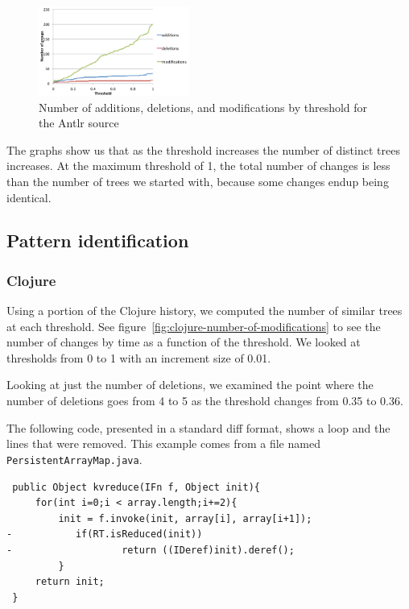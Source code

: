 \begin{figure}
\begin{center}
\includegraphics[width=0.44\textwidth]{figures/antlr-number-of-modifications.pdf}
\caption{Number of additions, deletions, and modifications by threshold for the Antlr source}
\label{fig:antlr-number-of-modifications}
\end{center}
\end{figure}

The graphs show us that as the threshold increases the number of distinct trees
increases. At the maximum threshold of 1, the total number of changes is less
than the number of trees we started with, because some changes endup being
identical.

\subsection{Pattern identification}

\subsubsection{Clojure}
Using a portion of the Clojure history, we computed the number of similar trees
at each threshold. See figure~\ref{fig:clojure-number-of-modifications} to see
the number of changes by time as a function of the threshold. We looked at
thresholds from 0 to 1 with an increment size of 0.01.

Looking at just the number of deletions, we examined the point where the number
of deletions goes from 4 to 5 as the threshold changes from 0.35 to 0.36.

The following code, presented in a standard diff format, shows a loop and the
lines that were removed. This example comes from a file named {\tt
PersistentArrayMap.java}.

\begin{verbatim}
 public Object kvreduce(IFn f, Object init){
     for(int i=0;i < array.length;i+=2){
         init = f.invoke(init, array[i], array[i+1]);
-           if(RT.isReduced(init))
-                   return ((IDeref)init).deref();
         }
     return init;
 }
\end{verbatim}

